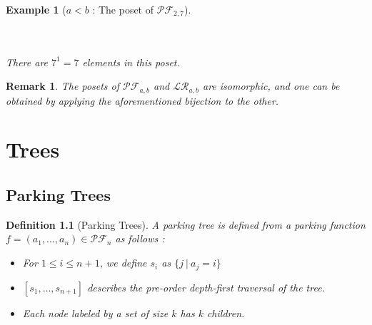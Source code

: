 \documentclass[12pt]{report}
\newtheorem{definition}{Definition}
\newtheorem*{example}{Example}
\newtheorem*{rem}{Remark}
\begin{document}
\begin{example}[$a < b$ : The poset of $\mathcal{PF}_{2,7}$]
    ~\\
    \begin{center}
        ~\\
        ~\\
        There are $7^1 = 7$ elements in this poset.
    \end{center}
\end{example}

\begin{rem}
    The posets of $\mathcal{PF}_{a,b}$ and $\mathcal{LR}_{a,b}$
    are isomorphic, and one can be obtained by
    applying the aforementioned bijection to the other.
\end{rem}


\chapter{Trees}

\section{Parking Trees}

\begin{definition}[Parking Trees]
    A \emph{parking tree} is defined from a parking
    function $f = (a_1, \ldots, a_n) \in \mathcal{PF}_n$
    as follows :
    \begin{itemize}
        \item For $1 \leqslant i \leqslant n+1$, we define
            $s_i$ as $\{j\ |\ a_j = i\}$
        \item $[s_1, \ldots, s_{n+1}]$ describes the 
        pre-order depth-first traversal of the tree.
        \item Each node labeled by a set of size $k$
            has $k$ children. 
    \end{itemize}
\end{definition}
\end{document}
